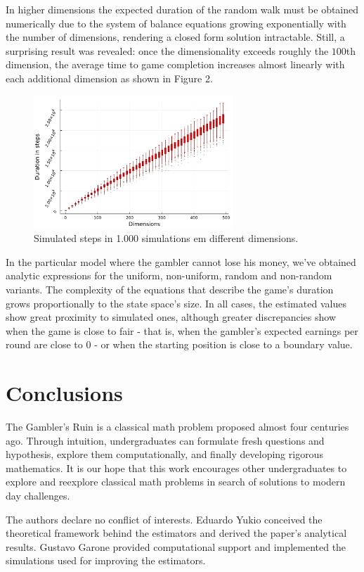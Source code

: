 \documentclass[a4paper,10pt,twocolumn]{article}
\begin{document}
In higher dimensions the expected duration of the random walk must be obtained
numerically due to the system of balance equations growing exponentially with
the number of dimensions, rendering a closed form solution intractable. Still, a
surprising result was revealed: once the dimensionality exceeds roughly the
$100$th dimension, the average time to game completion increases almost linearly
with each additional dimension as shown in Figure 2.

\begin{figure}[h]
    \centering
    \includegraphics[width=7.5cm]{"boxplots-en.pdf"}
    \centering
    \caption{Simulated steps in 1.000 simulations em different dimensions.}
\end{figure}

In the particular model where the gambler cannot lose his money, we've obtained
analytic expressions for the uniform, non-uniform, random and non-random
variants. The complexity of the equations that describe the game's duration
grows proportionally to the state space's size. In all cases, the estimated
values show great proximity to simulated ones, although greater discrepancies
show when the game is close to fair - that is, when the gambler's expected
earnings per round are close to $0$ - or when the starting position is close to
a boundary value.

\section{Conclusions}

The Gambler's Ruin is a classical math problem proposed almost four centuries
ago. Through intuition, undergraduates can formulate fresh questions and
hypothesis, explore them computationally, and finally developing rigorous
mathematics. It is our hope that this work encourages other undergraduates to
explore and reexplore classical math problems in search of solutions to modern
day challenges.

The authors declare no conflict of interests. Eduardo Yukio conceived the
theoretical framework behind the estimators and derived the paper's analytical
results. Gustavo Garone provided computational support and implemented the
simulations used for improving the estimators.
\end{document}
